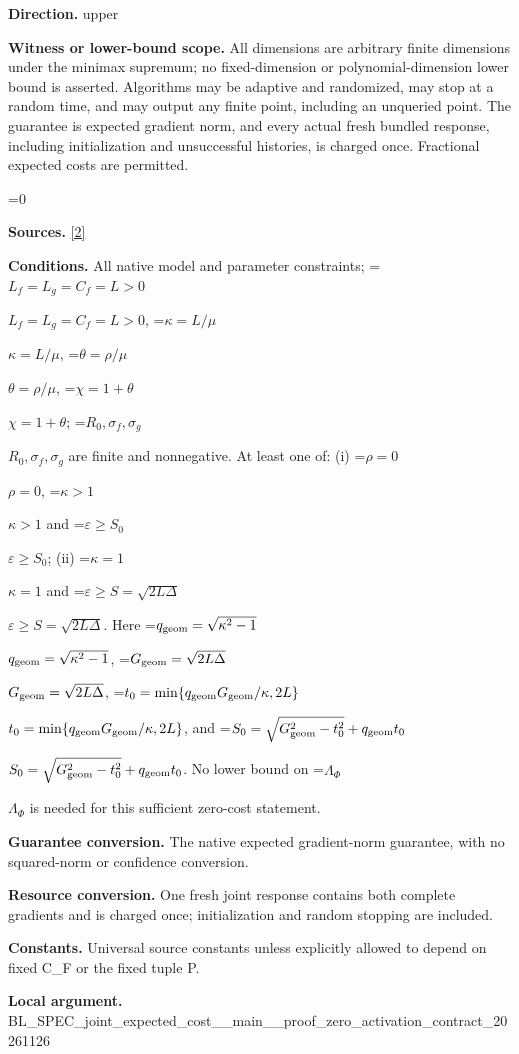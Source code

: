 \documentclass[10pt,a4paper]{article}
\newcommand{\AtlasMath}[1]{\par\begingroup\centering\setbox0=\hbox{$\displaystyle #1$}\ifdim\wd0>1.4\linewidth\typeout{ATLAS WIDE FORMULA: \the\wd0}\fi\ifdim\wd0>\linewidth\resizebox{\linewidth}{!}{\box0}\else\box0\fi\par\endgroup}
\newcommand{\AtlasInlineMath}[1]{\begingroup\setbox0=\hbox{$#1$}\ifdim\wd0>.4\linewidth\endgroup\AtlasMath{#1}\else\endgroup$#1$\fi}
\begin{document}
\textbf{Direction.} upper



\textbf{Witness or lower-bound scope.} All dimensions are arbitrary finite dimensions under the minimax supremum; no fixed-dimension or polynomial-dimension lower bound is asserted. Algorithms may be adaptive and randomized, may stop at a random time, and may output any finite point, including an unqueried point. The guarantee is expected gradient norm, and every actual fresh bundled response, including initialization and unsuccessful histories, is charged once. Fractional expected costs are permitted.



\AtlasMath{0}


\textbf{Sources.} \href{https://github.com/WU-Wendao/Colombo/blob/main/colombo_sensorium/Complexity_altas/data/sources/colombo/SFO_JOINT_20261126/manuscript.pdf}{[2]}



\textbf{Conditions.} All native model and parameter constraints; \AtlasInlineMath{L_f=L_g=C_f=L>0}, \AtlasInlineMath{\kappa=L/\mu}, \AtlasInlineMath{\theta=\rho/\mu}, \AtlasInlineMath{\chi=1+\theta}; \AtlasInlineMath{R_0,\sigma_f,\sigma_g} are finite and nonnegative. At least one of: (i) \AtlasInlineMath{\rho=0}, \AtlasInlineMath{\kappa>1} and \AtlasInlineMath{\varepsilon\ge S_0}; (ii) \AtlasInlineMath{\kappa=1} and \AtlasInlineMath{\varepsilon\ge S=\sqrt{2L\Delta}}. Here \AtlasInlineMath{q_{\rm geom}=\sqrt{\kappa^2-1}}, \AtlasInlineMath{G_{\rm geom}=\sqrt{2L\Delta}}, \AtlasInlineMath{t_0=\min\{q_{\rm geom}G_{\rm geom}/\kappa,2L\}}, and \AtlasInlineMath{S_0=\sqrt{G_{\rm geom}^2-t_0^2}+q_{\rm geom}t_0}. No lower bound on \AtlasInlineMath{\Lambda_\Phi} is needed for this sufficient zero-cost statement.



\textbf{Guarantee conversion.} The native expected gradient-norm guarantee, with no squared-norm or confidence conversion.



\textbf{Resource conversion.} One fresh joint response contains both complete gradients and is charged once; initialization and random stopping are included.



\textbf{Constants.} Universal source constants unless explicitly allowed to depend on fixed C\_F or the fixed tuple P.



\textbf{Local argument.} BL\_SPEC\_joint\_expected\_c\allowbreak{}ost\_\_main\_\_proof\_zero\_ac\allowbreak{}tivation\_contract\_202611\allowbreak{}26
\end{document}
